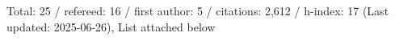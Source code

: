 Total: 25 / refereed: 16 / first author: 5 / citations: 2,612 / h-index: 17 (Last updated: 2025-06-26), List attached below